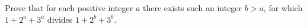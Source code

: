 Prove that for each positive integer $a$ there exists such an integer $b>a$, for which $1+2^a+3^a$ divides $1+2^b+3^b$.